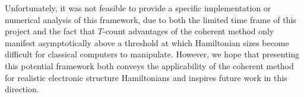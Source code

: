 Unfortunately, it was not feasible to provide a specific implementation or numerical analysis of this framework, due to both the limited time frame of this project and the fact that $T$-count advantages of the coherent method only manifest asymptotically above a threshold at which Hamiltonian sizes become difficult for classical computers to manipulate. However, we hope that presenting this potential framework both conveys the applicability of the coherent method for realistic electronic structure Hamiltonians and inspires future work in this direction.




